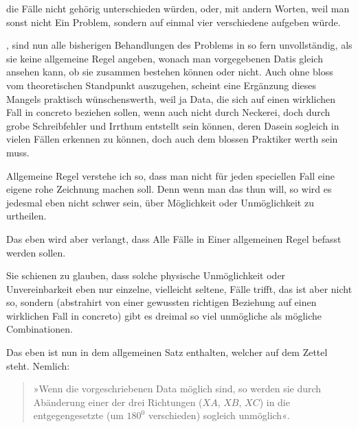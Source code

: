 \begin{center}\hspace{.8cm}\end{center}

die Fälle nicht gehörig unterschieden würden, oder, mit andern Worten, weil
man sonst nicht Ein Problem, sondern auf einmal vier verschiedene aufgeben
würde.

, sind nun alle bisherigen Behandlungen des Problems in
so fern unvollständig, als sie keine allgemeine Regel angeben, wonach man
vorgegebenen Datis gleich ansehen kann, ob sie zusammen bestehen können oder
nicht. Auch ohne bloss vom theoretischen Standpunkt auszugehen, scheint eine
Ergänzung dieses Mangels praktisch wünschenswerth, weil ja Data, die sich auf
einen wirklichen Fall in concreto beziehen sollen, wenn auch nicht durch
Neckerei, doch durch grobe Schreibfehler und Irrthum entstellt sein können,
deren Dasein sogleich in vielen Fällen erkennen zu können, doch auch dem
blossen Praktiker werth sein muss.

Allgemeine Regel verstehe ich so, dass man nicht für jeden speciellen Fall
eine eigene rohe Zeichnung machen soll. Denn wenn man das thun will, so wird
es jedesmal eben nicht schwer sein, über Möglichkeit oder Unmöglichkeit zu
urtheilen.

Das eben wird aber verlangt, dass Alle Fälle in Einer allgemeinen Regel
befasst werden sollen.

Sie schienen zu glauben, dass solche physische Unmöglichkeit oder
Unvereinbarkeit eben nur einzelne, vielleicht seltene, Fälle trifft, das ist
aber nicht so, sondern (abstrahirt von einer gewussten richtigen Beziehung
auf einen wirklichen Fall in concreto) gibt es dreimal so viel unmögliche als
mögliche Combinationen.

Das eben ist nun in dem allgemeinen Satz enthalten, welcher auf dem Zettel
steht. Nemlich:

\begin{quote}»Wenn die vorgeschriebenen Data möglich sind, so werden sie durch Abänderung
einer der drei Richtungen ($XA$, $XB$, $XC$) in die entgegengesetzte (um
$180^0$ verschieden) sogleich unmöglich«.\end{quote}
